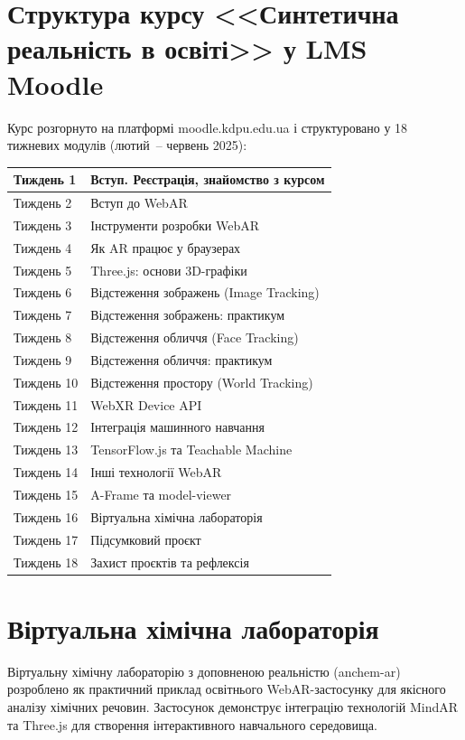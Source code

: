 \section{Структура курсу <<Синтетична реальність в освіті>> у LMS Moodle}\label{app:moodle}

Курс розгорнуто на платформі moodle.kdpu.edu.ua і структуровано у 18 тижневих модулів (лютий~-- червень 2025):

\begin{longtable}{|p{}|p{}|}
\hline
Тиждень 1 & Вступ. Реєстрація, знайомство з курсом \\
\hline
Тиждень 2 & Вступ до WebAR \\
\hline
Тиждень 3 & Інструменти розробки WebAR \\
\hline
Тиждень 4 & Як AR працює у браузерах \\
\hline
Тиждень 5 & Three.js: основи 3D-графіки \\
\hline
Тиждень 6 & Відстеження зображень (Image Tracking) \\
\hline
Тиждень 7 & Відстеження зображень: практикум \\
\hline
Тиждень 8 & Відстеження обличчя (Face Tracking) \\
\hline
Тиждень 9 & Відстеження обличчя: практикум \\
\hline
Тиждень 10 & Відстеження простору (World Tracking) \\
\hline
Тиждень 11 & WebXR Device API \\
\hline
Тиждень 12 & Інтеграція машинного навчання \\
\hline
Тиждень 13 & TensorFlow.js та Teachable Machine \\
\hline
Тиждень 14 & Інші технології WebAR \\
\hline
Тиждень 15 & A-Frame та model-viewer \\
\hline
Тиждень 16 & Віртуальна хімічна лабораторія \\
\hline
Тиждень 17 & Підсумковий проєкт \\
\hline
Тиждень 18 & Захист проєктів та рефлексія \\
\hline
\end{longtable}

\section{Віртуальна хімічна лабораторія}\label{app:anchem}

Віртуальну хімічну лабораторію з доповненою реальністю (anchem-ar) розроблено як практичний приклад освітнього WebAR-застосунку для якісного аналізу хімічних речовин. Застосунок демонструє інтеграцію технологій MindAR та Three.js для створення інтерактивного навчального середовища.

\label{last_page}
